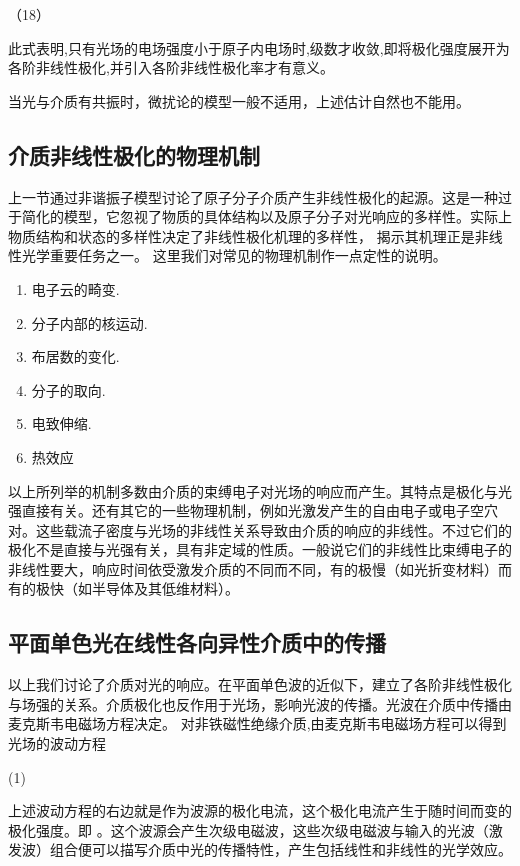                                        （18）

此式表明,只有光场的电场强度小于原子内电场时,级数才收敛,即将极化强度展开为各阶非线性极化,并引入各阶非线性极化率才有意义。

当光与介质有共振时，微扰论的模型一般不适用，上述估计自然也不能用。 

\subsection{介质非线性极化的物理机制}
    
 上一节通过非谐振子模型讨论了原子分子介质产生非线性极化的起源。这是一种过于简化的模型，它忽视了物质的具体结构以及原子分子对光响应的多样性。实际上物质结构和状态的多样性决定了非线性极化机理的多样性， 揭示其机理正是非线性光学重要任务之一。 这里我们对常见的物理机制作一点定性的说明。

\begin{enumerate}
    \item 电子云的畸变.  
    \item 分子内部的核运动.  
    \item 布居数的变化.  
    \item 分子的取向.  
    \item 电致伸缩.  
    \item 热效应
\end{enumerate}

以上所列举的机制多数由介质的束缚电子对光场的响应而产生。其特点是极化与光强直接有关。还有其它的一些物理机制，例如光激发产生的自由电子或电子空穴对。这些载流子密度与光场的非线性关系导致由介质的响应的非线性。不过它们的极化不是直接与光强有关，具有非定域的性质。一般说它们的非线性比束缚电子的非线性要大，响应时间依受激发介质的不同而不同，有的极慢（如光折变材料）而有的极快（如半导体及其低维材料）。

\subsection{平面单色光在线性各向异性介质中的传播}

以上我们讨论了介质对光的响应。在平面单色波的近似下，建立了各阶非线性极化与场强的关系。介质极化也反作用于光场，影响光波的传播。光波在介质中传播由麦克斯韦电磁场方程决定。 对非铁磁性绝缘介质,由麦克斯韦电磁场方程可以得到光场的波动方程

                                (1)

上述波动方程的右边就是作为波源的极化电流，这个极化电流产生于随时间而变的极化强度。即 。这个波源会产生次级电磁波，这些次级电磁波与输入的光波（激发波）组合便可以描写介质中光的传播特性，产生包括线性和非线性的光学效应。

